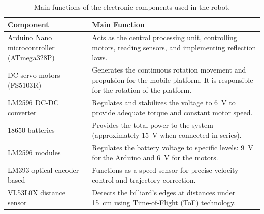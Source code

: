 \documentclass[pdflatex,sn-mathphys-num,iicol]{sn-jnl}%
\theoremstyle{thmstyleone}%
\theoremstyle{thmstyletwo}%
\theoremstyle{thmstylethree}%
\begin{document}
\begin{table}[!htbp]

\caption{\label{tab:comp_simple} Main functions of the electronic components used in the robot.}

\begin{tabular}{| p{} | p{} |}

\hline

\textbf{Component} & \textbf{Main Function} \\

\hline
\hline

Arduino Nano microcontroller (ATmega328P) & Acts as the central processing unit, controlling motors, reading sensors, and implementing reflection laws. \\

\hline

DC servo-motors (FS5103R) & Generates the continuous rotation movement and propulsion for the mobile platform. It is responsible for the rotation of the platform. \\

\hline

LM2596 DC-DC converter & Regulates and stabilizes the voltage to 6~V to provide adequate torque and constant motor speed. \\

\hline

18650 batteries & Provides the total power to the system (approximately 15~V when connected in series). \\

\hline

LM2596 modules & Regulates the battery voltage to specific levels: 9~V for the Arduino and 6~V for the motors. \\

\hline

LM393 optical encoder-based & Functions as a speed sensor for precise velocity control and trajectory correction. \\

\hline

VL53L0X distance sensor & Detects the billiard's edges at distances under 15~cm using Time-of-Flight (ToF) technology. \\

\hline

\end{tabular}

\end{table}
\end{document}
